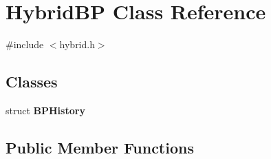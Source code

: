 \hypertarget{classHybridBP}{
\section{HybridBP Class Reference}
\label{classHybridBP}
}


{\ttfamily \#include $<$hybrid.h$>$}

\subsection*{Classes}
\begin{DoxyCompactItemize}
\item 
struct {\bfseries BPHistory}
\end{DoxyCompactItemize}
\subsection*{Public Member Functions}
